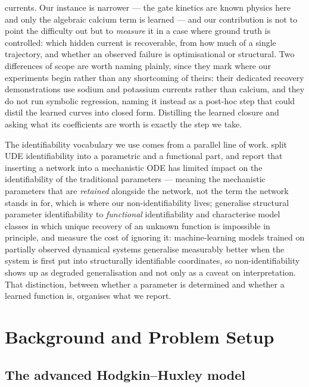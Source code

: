 \documentclass{article}
\begin{document}
currents. Our instance is narrower --- the gate kinetics are known physics here
and only the algebraic calcium term is learned --- and our
contribution is not to point the difficulty out but to \emph{measure} it in a case where
ground truth is controlled: which hidden current is recoverable, from how much of
a single trajectory, and whether an observed failure is optimisational or
structural. Two differences of scope are worth naming plainly, since they mark
where our experiments begin rather than any shortcoming of theirs: their
dedicated recovery demonstrations use sodium and potassium currents rather than
calcium, and they do not run symbolic regression, naming it instead as a
post-hoc step that could distil the learned curves into closed form. Distilling
the learned closure and asking what its coefficients are worth is exactly the
step we take.

The identifiability vocabulary we use comes from a parallel line of work.
\citet{loman2025ude} split UDE identifiability into a parametric and a functional
part, and report that inserting a network into a mechanistic ODE has limited
impact on the identifiability of the traditional parameters --- meaning the
mechanistic parameters that are \emph{retained} alongside the network, not the
term the network stands in for, which is where our non-identifiability lives;
\citet{loman2026structural} generalise structural parameter identifiability to
\emph{functional} identifiability and characterise model classes in which unique
recovery of an unknown function is impossible in principle, and
\citet{norden2025structural} measure the cost of ignoring it: machine-learning
models trained on partially observed dynamical systems generalise measurably
better when the system is first put into structurally identifiable coordinates,
so non-identifiability shows up as degraded generalisation and not only as a
caveat on interpretation. That distinction, between whether a parameter is
determined and whether a learned function is, organises what we report.

\section{Background and Problem Setup}
\label{sec:setup}

\subsection{The advanced Hodgkin--Huxley model}
\label{sec:setup-model}
\end{document}
